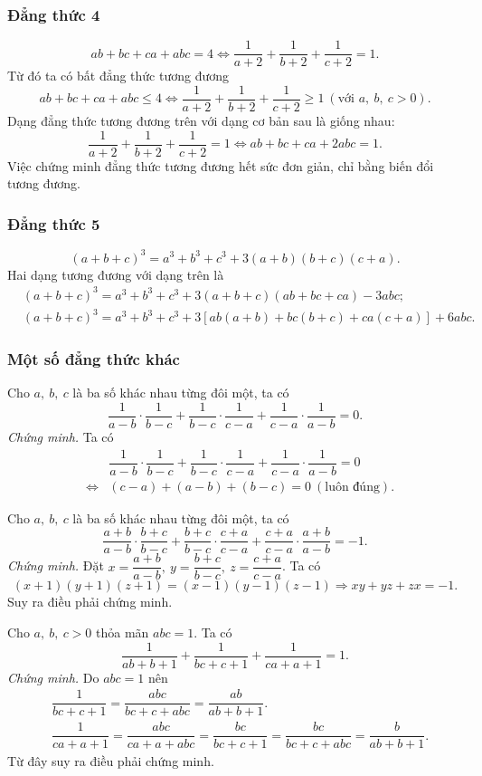 {\subsubsection{Đẳng thức 4}
\[ 
ab+bc+ca+abc=4\Leftrightarrow \dfrac{1}{a+2}+\dfrac{1}{b+2}+\dfrac{1}{c+2}=1.
\]
Từ đó ta có bất đẳng thức tương đương
\[ 
ab+bc+ca+abc\leq 4\Leftrightarrow \dfrac{1}{a+2}+\dfrac{1}{b+2}+\dfrac{1}{c+2}\geq 1\ (\text{với }a,\ b,\ c>0).
\]
Dạng đẳng thức tương đương trên với dạng cơ bản sau là giống nhau:
\[ 
\dfrac{1}{a+2}+\dfrac{1}{b+2}+\dfrac{1}{c+2}=1\Leftrightarrow ab+bc+ca+2abc=1.
\]
Việc chứng minh đẳng thức tương đương hết sức đơn giản, chỉ bằng biến đổi tương đương.
\subsubsection{Đẳng thức 5}
\[ 
(a+b+c)^{3}=a^{3}+b^{3}+c^{3}+3(a+b)(b+c)(c+a).
\]
Hai dạng tương đương với dạng trên là
\begin{align*}
&(a+b+c)^{3}=a^{3}+b^{3}+c^{3}+3(a+b+c)(ab+bc+ca)-3abc;\\
&(a+b+c)^{3}=a^{3}+b^{3}+c^{3}+3[ab(a+b)+bc(b+c)+ca(c+a)]+6abc.
\end{align*}
\subsubsection{Một số đẳng thức khác}
\begin{listEX}
	\item Cho $ a,\ b,\ c $ là ba số khác nhau từng đôi một, ta có
	\[ 
	\dfrac{1}{a-b}\cdot \dfrac{1}{b-c}+\dfrac{1}{b-c}\cdot \dfrac{1}{c-a}+\dfrac{1}{c-a}\cdot \dfrac{1}{a-b}=0.\tag{6.1}
	\]
	\textit{Chứng minh.} Ta có
	\begin{eqnarray*}
		&&\dfrac{1}{a-b}\cdot \dfrac{1}{b-c}+\dfrac{1}{b-c}\cdot \dfrac{1}{c-a}+\dfrac{1}{c-a}\cdot \dfrac{1}{a-b}=0\\
		&\Leftrightarrow&(c-a)+(a-b)+(b-c)=0\ (\text{luôn đúng}).
	\end{eqnarray*}
	\item Cho $ a,\ b,\ c $ là ba số khác nhau từng đôi một, ta có
	\[ 
	\dfrac{a+b}{a-b}\cdot \dfrac{b+c}{b-c}+\dfrac{b+c}{b-c}\cdot \dfrac{c+a}{c-a}+\dfrac{c+a}{c-a}\cdot \dfrac{a+b}{a-b}=-1.\tag{6.2}
	\]
	\textit{Chứng minh.} Đặt $ x=\dfrac{a+b}{a-b},\ y=\dfrac{b+c}{b-c},\ z=\dfrac{c+a}{c-a} $. Ta có 
	\[ 
	(x+1)(y+1)(z+1)=(x-1)(y-1)(z-1)\Rightarrow xy+yz+zx=-1.
	\]
	Suy ra điều phải chứng minh.
	\item Cho $ a,\ b,\ c>0 $ thỏa mãn $ abc=1 $. Ta có
	\[ 
	\dfrac{1}{ab+b+1}+\dfrac{1}{bc+c+1}+\dfrac{1}{ca+a+1}=1.\tag{6.3}
	\]
	\textit{Chứng minh.} Do $ abc=1 $ nên
	\begin{align*}
	&\dfrac{1}{bc+c+1}=\dfrac{abc}{bc+c+abc}=\dfrac{ab}{ab+b+1}.\\
	&\dfrac{1}{ca+a+1}=\dfrac{abc}{ca+a+abc}=\dfrac{bc}{bc+c+1}=\dfrac{bc}{bc+c+abc}=\dfrac{b}{ab+b+1}.
	\end{align*}
	Từ đây suy ra điều phải chứng minh.
\end{listEX}
}
